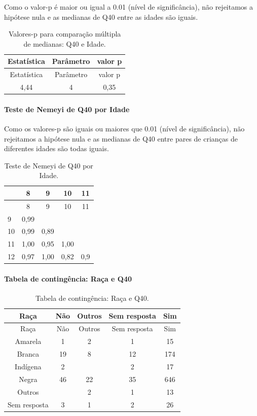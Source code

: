 \documentclass[]{article}
\let\oldparagraph\paragraph
\renewcommand{\paragraph}[1]{\oldparagraph{#1}\mbox{}}
\begin{document}
Como o valor-p é maior ou igual a 0.01 (nível de significância), não rejeitamos a hipótese nula e as medianas de Q40 entre as idades são iguais.

\begin{longtable}[]{@{}ccc@{}}
\caption{\label{tab:unnamed-chunk-1574}Valores-p para comparação múltipla de medianas: Q40 e Idade.}\tabularnewline
\toprule
Estatística & Parâmetro & valor p\tabularnewline
\midrule
\endfirsthead
\toprule
Estatística & Parâmetro & valor p\tabularnewline
\midrule
\endhead
4,44 & 4 & 0,35\tabularnewline
\bottomrule
\end{longtable}

\hypertarget{teste-de-nemeyi-de-q40-por-idade}{%
\paragraph{Teste de Nemeyi de Q40 por Idade}\label{teste-de-nemeyi-de-q40-por-idade}}

Como os valores-p são iguais ou maiores que 0.01 (nível de significância), não rejeitamos a hipótese nula e as medianas de Q40 entre pares de crianças de diferentes idades são todas iguais.

\begin{longtable}[]{@{}lcccc@{}}
\caption{\label{tab:unnamed-chunk-1576}Teste de Nemeyi de Q40 por Idade.}\tabularnewline
\toprule
& 8 & 9 & 10 & 11\tabularnewline
\midrule
\endfirsthead
\toprule
& 8 & 9 & 10 & 11\tabularnewline
\midrule
\endhead
9 & 0,99 & & &\tabularnewline
10 & 0,99 & 0,89 & &\tabularnewline
11 & 1,00 & 0,95 & 1,00 &\tabularnewline
12 & 0,97 & 1,00 & 0,82 & 0,9\tabularnewline
\bottomrule
\end{longtable}

\cleardoublepage

\hypertarget{tabela-de-continguxeancia-rauxe7a-e-q40}{%
\paragraph{Tabela de contingência: Raça e Q40}\label{tabela-de-continguxeancia-rauxe7a-e-q40}}

\begin{longtable}[]{@{}ccccc@{}}
\caption{\label{tab:unnamed-chunk-1577}Tabela de contingência: Raça e Q40.}\tabularnewline
\toprule
Raça & Não & Outros & Sem resposta & Sim\tabularnewline
\midrule
\endfirsthead
\toprule
Raça & Não & Outros & Sem resposta & Sim\tabularnewline
\midrule
\endhead
Amarela & 1 & 2 & 1 & 15\tabularnewline
Branca & 19 & 8 & 12 & 174\tabularnewline
Indígena & 2 & & 2 & 17\tabularnewline
Negra & 46 & 22 & 35 & 646\tabularnewline
Outros & & 2 & 1 & 13\tabularnewline
Sem resposta & 3 & 1 & 2 & 26\tabularnewline
\bottomrule
\end{longtable}
\end{document}

